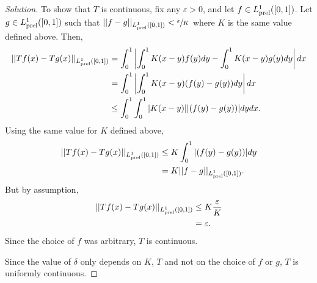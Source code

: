 \documentclass[11pt,letterpaper]{article}
\newcommand{\eps}{\varepsilon}
\renewcommand{\epsilon}{\eps}
\newcommand{\prel}{{\rm prel}}
\newenvironment{prob}[1]
  {\renewcommand\theinnerprob{#1}\innerprob}
  {\endinnerprob}
\newenvironment{solution}
  {\renewcommand\qedsymbol{}\begin{proof}[Solution]}
  {\end{proof}\bigskip}
\begin{document}
\begin{solution}
 	To show that $T$ is continuous, fix any $\epsilon > 0$, and let $f\in L_{\rm prel}^1([0,1])$. Let $g\in L_{\rm prel}^1([0,1])$ such that $||f-g||_{L_\prel^1([0,1])} < \sfrac{\epsilon}{K}$ where $K$ is the same value defined above. Then,
 	\[\begin{split}
 		||Tf(x)-Tg(x)||_{L_\prel^1([0,1])} &= \int_{0}^{1} \left | \int_{0}^{1} K(x-y)f(y)dy - \int_{0}^{1} K(x-y)g(y)dy \right | dx \\
 		&= \int_{0}^{1} \left | \int_{0}^{1} K(x-y)(f(y) - g(y) ) dy \right | dx \\
 		&\leq \int_{0}^{1} \int_{0}^{1} |K(x-y)||(f(y) - g(y))| dy dx.
 	\end{split}\]
 	Using the same value for $K$ defined above,
 	\[\begin{split}
 		||Tf(x)-Tg(x)||_{L_\prel^1([0,1])} &\leq K \int_{0}^{1}|(f(y) - g(y))| dy\\
 		&= K ||f-g||_{L_\prel^1([0,1])}.
	\end{split}\]
	But by assumption,
	\[\begin{split}
		||Tf(x)-Tg(x)||_{L_\prel^1([0,1])} &\leq K \frac{\epsilon}{K}\\
		&= \epsilon.
	\end{split}\]
	Since the choice of $f$ was arbitrary, $T$ is continuous.
	
	Since the value of $\delta$ only depends on $K$, $T$ and not on the choice of $f$ or $g$, $T$ is uniformly continuous.
\end{solution}
\newpage




%
\end{document}
